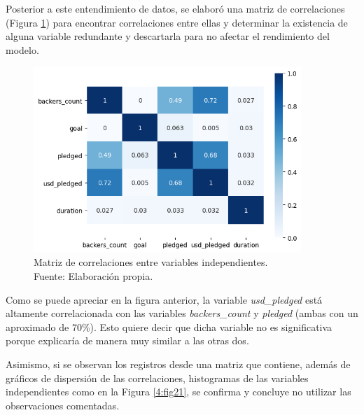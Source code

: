 \newpage
Posterior a este entendimiento de datos, se elaboró una matriz de correlaciones (Figura \ref{4:fig20}) para encontrar correlaciones entre ellas y determinar la existencia de alguna variable redundante y descartarla para no afectar el rendimiento del modelo.

\begin{figure}[!ht]
	\begin{center}
		\includegraphics[width=0.90\textwidth]{4/figures/metadata correlation.png}
		\caption[Matriz de correlaciones entre variables independientes]{Matriz de correlaciones entre variables independientes.\\
			Fuente: Elaboración propia.}
		\label{4:fig20}
	\end{center}
\end{figure}

Como se puede apreciar en la figura anterior, la variable \textit{usd\_pledged} está altamente correlacionada con las variables \textit{backers\_count} y \textit{pledged} (ambas con un aproximado de 70\%). Esto quiere decir que dicha variable no es significativa porque explicaría de manera muy similar a las otras dos.

\newpage
Asimismo, si se observan los registros desde una matriz que contiene, además de gráficos de dispersión de las correlaciones, histogramas de las variables independientes como en la Figura \ref{4:fig21}, se confirma y concluye no utilizar las observaciones comentadas.

